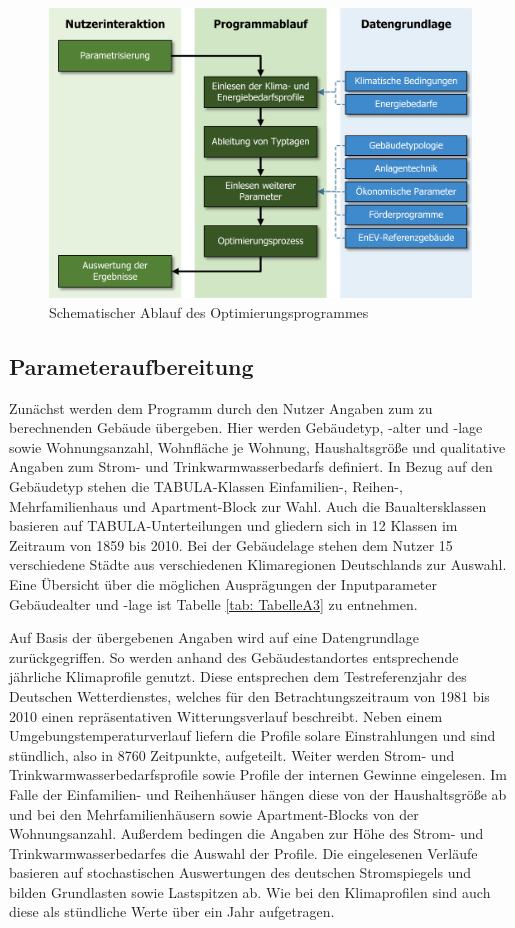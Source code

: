 \begin{figure}[H]
	\centering
		\includegraphics{Pictures/ProzessOptiProgramm.jpg}
	\caption{Schematischer Ablauf des Optimierungsprogrammes}
	\label{fig: Abbildung261} 
\end{figure}

\subsection{Parameteraufbereitung}
\label{subsec:Sektion261}

Zunächst werden dem Programm durch den Nutzer Angaben zum zu berechnenden Gebäude übergeben.
Hier werden Gebäudetyp, -alter und -lage sowie Wohnungsanzahl, Wohnfläche je Wohnung, Haushaltsgröße und qualitative Angaben zum Strom- und Trinkwarmwasserbedarfs definiert.
In Bezug auf den Gebäudetyp stehen die TABULA-Klassen Einfamilien-, Reihen-, Mehrfamilienhaus und Apartment-Block zur Wahl.
Auch die Baualtersklassen basieren auf TABULA-Unterteilungen und gliedern sich in 12 Klassen im Zeitraum von 1859 bis 2010.
Bei der Gebäudelage stehen dem Nutzer 15 verschiedene Städte aus verschiedenen Klimaregionen Deutschlands zur Auswahl.
Eine Übersicht über die möglichen Ausprägungen der Inputparameter Gebäudealter und -lage ist Tabelle \ref{tab: TabelleA3} zu entnehmen.

Auf Basis der übergebenen Angaben wird auf eine Datengrundlage zurückgegriffen.
So werden anhand des Gebäudestandortes entsprechende jährliche Klimaprofile genutzt.
Diese entsprechen dem Testreferenzjahr des Deutschen Wetterdienstes, welches für den Betrachtungszeitraum von 1981 bis 2010 einen repräsentativen Witterungsverlauf beschreibt.
Neben einem Umgebungstemperaturverlauf liefern die Profile solare Einstrahlungen und sind stündlich, also in 8760 Zeitpunkte, aufgeteilt.
Weiter werden Strom- und Trinkwarmwasserbedarfsprofile sowie Profile der internen Gewinne eingelesen.
Im Falle der Einfamilien- und Reihenhäuser hängen diese von der Haushaltsgröße ab und bei den Mehrfamilienhäusern sowie Apartment-Blocks von der Wohnungsanzahl.
Außerdem bedingen die Angaben zur Höhe des Strom- und Trinkwarmwasserbedarfes die Auswahl der Profile.
Die eingelesenen Verläufe basieren auf stochastischen Auswertungen des deutschen Stromspiegels und bilden Grundlasten sowie Lastspitzen ab.
Wie bei den Klimaprofilen sind auch diese als stündliche Werte über ein Jahr aufgetragen.


